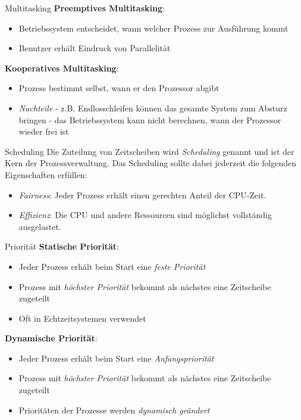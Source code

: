 \documentclass[german]{../spicker}
\begin{document}
\begin{bonus}{Multitasking}
    \textbf{Preemptives Multitasking}:
    \begin{itemize}
        \item Betriebssystem entscheidet, wann welcher Prozess zur Ausführung kommt
        \item Benutzer erhält Eindruck von Parallelität
    \end{itemize}

    \textbf{Kooperatives Multitasking}:
    \begin{itemize}
        \item Prozess bestimmt selbst, wann er den Prozessor abgibt
        \item \emph{Nachteile}
              \subitem - z.B. Endlosschleifen können das gesamte System zum Absturz bringen
              \subitem - das Betriebssystem kann nicht berechnen, wann der Prozessor wieder frei ist
    \end{itemize}
\end{bonus}

\begin{defi}{Scheduling}
    Die Zuteilung von Zeitscheiben wird \emph{Scheduling} genannt und ist der Kern der Prozessverwaltung.
    Das Scheduling sollte dabei jederzeit die folgenden Eigenschaften erfüllen:
    \begin{itemize}
        \item \emph{Fairness}: Jeder Prozess erhält einen gerechten Anteil der CPU-Zeit.
        \item \emph{Effizienz}: Die CPU und andere Ressourcen sind möglichst vollständig ausgelastet.
    \end{itemize}
\end{defi}

\begin{bonus}{Priorität}
    \textbf{Statische Priorität}:
    \begin{itemize}
        \item Jeder Prozess erhält beim Start eine \emph{feste Priorität}
        \item Prozess mit \emph{höchster Priorität} bekommt als nächstes eine Zeitscheibe zugeteilt
        \item Oft in Echtzeitsystemen verwendet
    \end{itemize}

    \textbf{Dynamische Priorität}:
    \begin{itemize}
        \item Jeder Prozess erhält beim Start eine \emph{Anfangspriorität}
        \item Prozess mit \emph{höchster Priorität} bekommt als nächstes eine Zeitscheibe zugeteilt
        \item Prioritäten der Prozesse werden \emph{dynamisch geändert}
    \end{itemize}
\end{bonus}
\end{document}
